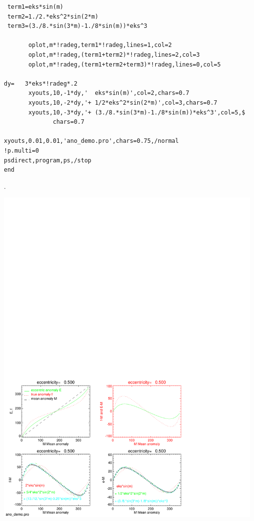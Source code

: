 \documentclass[a4paper,12pt]{article}
\def\black{\color{RGBblack}}
\begin{document}
{{{{{\begin{verbatim}
 term1=eks*sin(m)
 term2=1./2.*eks^2*sin(2*m)
 term3=(3./8.*sin(3*m)-1./8*sin(m))*eks^3

       oplot,m*!radeg,term1*!radeg,lines=1,col=2
       oplot,m*!radeg,(term1+term2)*!radeg,lines=2,col=3
       oplot,m*!radeg,(term1+term2+term3)*!radeg,lines=0,col=5

dy=   3*eks*!radeg*.2
       xyouts,10,-1*dy,'  eks*sin(m)',col=2,chars=0.7
       xyouts,10,-2*dy,'+ 1/2*eks^2*sin(2*m)',col=3,chars=0.7
       xyouts,10,-3*dy,'+ (3./8.*sin(3*m)-1./8*sin(m))*eks^3',col=5,$
              chars=0.7

xyouts,0.01,0.01,'ano_demo.pro',chars=0.75,/normal
!p.multi=0
psdirect,program,ps,/stop
end
\end{verbatim}} \black
\newpage
.

\vspace{-15cm}

\includegraphics[width=0.9\paperwidth,height=1\paperheight]{ano_demo.pdf}

\clearpage




}}}}
\end{document}
